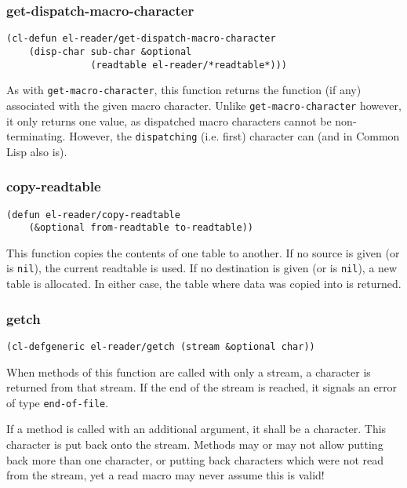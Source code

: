 \documentclass[a4paper,10pt,twoside]{report}
\newcommand{\cl}{Common Lisp}
\newcommand{\sym}[1]{\texttt{#1}}
\newcommand{\fun}[1]{\texttt{#1}}
\newcommand{\nil}{\sym{nil}}
\begin{document}
\subsubsection{get-dispatch-macro-character}
\label{subsubsec:get-dispatch-macro-character}

\begin{lstlisting}[style=lispinline]
(cl-defun el-reader/get-dispatch-macro-character
    (disp-char sub-char &optional
               (readtable el-reader/*readtable*)))
\end{lstlisting}

As with \fun{get-macro-character}, this function returns the function (if any)
associated with the given macro character.  Unlike \fun{get-macro-character}
however, it only returns one value, as dispatched macro characters cannot be
non-terminating.  However, the \texttt{dispatching} (i.e. first) character can
(and in \cl{} also is).

\subsubsection{copy-readtable}
\label{subsubsec:copy-readtable}

\begin{lstlisting}[style=lispinline]
(defun el-reader/copy-readtable
    (&optional from-readtable to-readtable))
\end{lstlisting}

This function copies the contents of one table to another.  If no source is
given (or is \nil{}), the current readtable is used.  If no destination is given
(or is \nil{}), a new table is allocated.  In either case, the table where data
was copied into is returned.

\subsubsection{getch}
\label{subsubsec:getch}

\begin{lstlisting}[style=lispinline]
(cl-defgeneric el-reader/getch (stream &optional char))
\end{lstlisting}

When methods of this function are called with only a stream, a character is
returned from that stream.  If the end of the stream is reached, it signals an
error of type \sym{end-of-file}.

If a method is called with an additional argument, it shall be a character.
This character is put back onto the stream.  Methods may or may not allow
putting back more than one character, or putting back characters which were not
read from the stream, yet a read macro may never assume this is valid!
\end{document}
